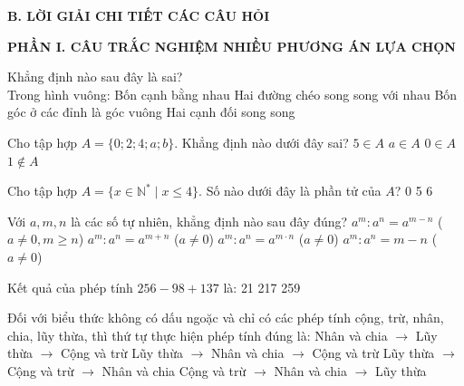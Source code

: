 \documentclass[12pt,a4paper]{article}
\begin{document}
\noindent\textbf{\large B. LỜI GIẢI CHI TIẾT CÁC CÂU HỎI}
\vspace{2mm}

\noindent\textbf{\large PHẦN I. CÂU TRẮC NGHIỆM NHIỀU PHƯƠNG ÁN LỰA CHỌN}
\vspace{1mm}
\begin{ex}
Khẳng định nào sau đây là sai?\\Trong hình vuông:
\choice
{Bốn cạnh bằng nhau}
{\True Hai đường chéo song song với nhau}
{Bốn góc ở các đỉnh là góc vuông}
{Hai cạnh đối song song}
\end{ex}

\begin{ex}
Cho tập hợp $A = \{0; 2; 4; a; b\}$. Khẳng định nào dưới đây sai?
\choice
{\True $5 \in A$}
{$a \in A$}
{$0 \in A$}
{$1 \notin A$}
\end{ex}

\begin{ex}
Cho tập hợp $A = \{x \in \mathbb{N}^* \mid x \le 4\}$. Số nào dưới đây là phần tử của $A$?
\choice
{0}
{}
{5}
{6}
\end{ex}

\begin{ex}
Với $a, m, n$ là các số tự nhiên, khẳng định nào sau đây đúng?
\choice
{\True $a^m : a^n = a^{m-n}$ ($a \ne 0, m \ge n$)}
{$a^m : a^n = a^{m+n}$ ($a \ne 0$)}
{$a^m : a^n = a^{m \cdot n}$ ($a \ne 0$)}
{$a^m : a^n = m - n$ ($a \ne 0$)}
\end{ex}

\begin{ex}
Kết quả của phép tính $256 - 98 + 137$ là:
\choice
{21}
{217}
{259}
{}
\end{ex}

\begin{ex}
Đối với biểu thức không có dấu ngoặc và chỉ có các phép tính cộng, trừ, nhân, chia, lũy thừa, thì thứ tự thực hiện phép tính đúng là:
\choice
{Nhân và chia $\to$ Lũy thừa $\to$ Cộng và trừ}
{\True Lũy thừa $\to$ Nhân và chia $\to$ Cộng và trừ}
{Lũy thừa $\to$ Cộng và trừ $\to$ Nhân và chia}
{Cộng và trừ $\to$ Nhân và chia $\to$ Lũy thừa}
\end{ex}
\end{document}
